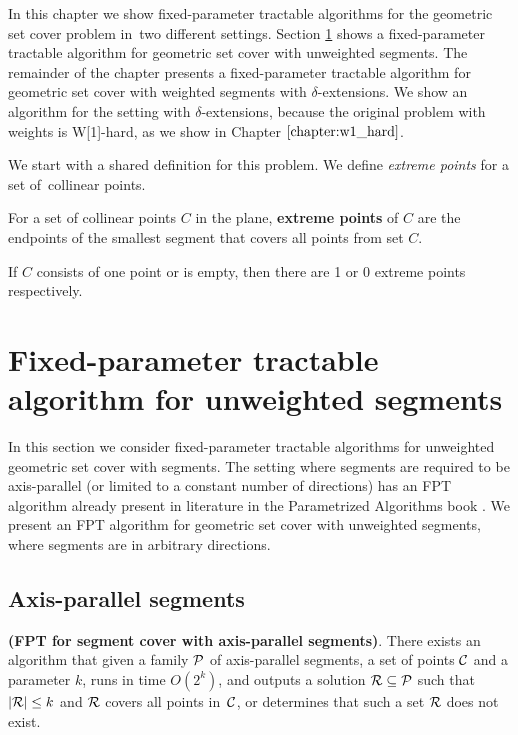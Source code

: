 In this chapter we show fixed-parameter tractable algorithms
for the geometric set cover problem in~two different settings.
Section \ref{section:fpt_unweighted} shows 
a fixed-parameter tractable algorithm for geometric set cover with unweighted segments.
The remainder of the chapter presents
a fixed-parameter tractable algorithm for geometric set cover with weighted segments
with $\delta$-extensions.
We show an algorithm for the setting with $\delta$-extensions,
because the original problem with weights is W[1]-hard,
as we show in Chapter $\ref{chapter:w1_hard}$.

We start with a shared definition for this problem.
We define \textit{extreme points} for a set of~collinear points.

\begin{defi}
	For a set of collinear points $C$ in the plane,
	\textbf{extreme points} of $C$ are the endpoints
	of the smallest segment that covers all points from set $C$.
	
	If $C$ consists of one point or is empty, then
	there are 1 or 0 extreme points respectively.
\end{defi}

\section{Fixed-parameter tractable algorithm for unweighted segments}
\label{section:fpt_unweighted}
In this section we consider fixed-parameter tractable
algorithms for unweighted geometric set cover with segments.
The setting where segments are required to be axis-parallel
(or limited to a constant number of directions) has an FPT
algorithm already present in literature in
the Parametrized Algorithms book \cite{platypus_book}.
We present an FPT algorithm for geometric set cover
with unweighted segments, where segments are in arbitrary directions.

\subsection{Axis-parallel segments}
\begin{tw}
	\textbf{(FPT for segment cover with axis-parallel segments)}.
	There exists an algorithm that given a family $\mathcal{P}$ of
	axis-parallel segments,
	a set of points $\mathcal{C}$
	and a parameter $k$,
	runs in time $O(2^k)$,
	and outputs a solution $\mathcal{R} \subseteq \mathcal{P}$
	such that $|\mathcal{R}| \le k$ and $\mathcal{R}$ covers all points in~$\mathcal{C}$,
	or determines that such a set $\mathcal{R}$ does not exist.
\end{tw}

